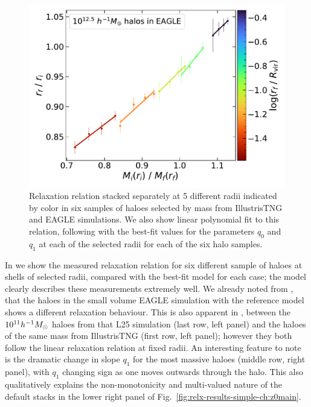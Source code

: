 \begin{figure}
    \includegraphics[width=0.48\linewidth]{plots/fit_show_rf_M_E100_M12.5.pdf}
    \caption{Relaxation relation stacked separately at 5 different radii indicated by color in six samples of haloes selected by mass from IllustrisTNG and EAGLE simulations. We also show linear polynomial fit to this relation, following  with the best-fit values for the parameters $q_0$ and $q_1$ at each of the selected radii for each of the six halo samples.} %
    \label{fig:rf-fit-show-ch:z0main}
\end{figure}

In  we show the measured relaxation relation for six different sample of haloes at shells of selected radii, compared with the best-fit model  for each case; the model clearly describes these measurements extremely well. We already noted from , that the haloes in the small volume EAGLE simulation with the reference model shows a different relaxation behaviour. This is also apparent in , between the $10^{11} h^{-1}M_{\odot}$ haloes from that L25 simulation (last row, left panel) and the haloes of the same mass from IllustrisTNG (first row, left panel); however they both follow the linear relaxation relation at fixed radii. An interesting feature to note is the dramatic change in slope $q_1$ for the most massive haloes (middle row, right panel), with $q_1$ changing sign as one moves outwards through the halo. This also qualitatively explains the non-monotonicity and multi-valued nature of the default stacks in the lower right panel of Fig.~\ref{fig:relx-results-simple-ch:z0main}.


